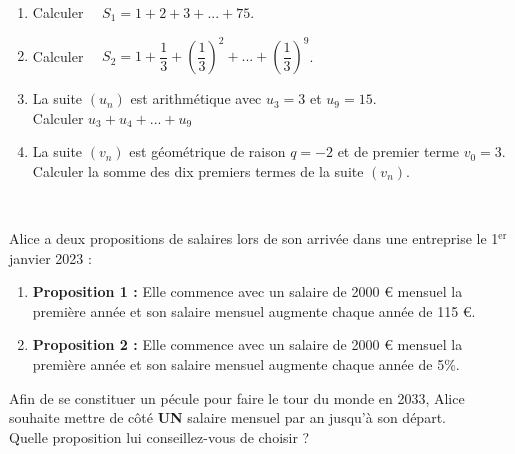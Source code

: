 \documentclass[a4paper,11pt,cours]{nsi} %
\begin{document}
\begin{demonstration}
\end{demonstration}

\begin{exemple}[s]
	\begin{enumerate}
		\item 	Calculer $\quad S_1=1+2+3+...+75$.
		\item 	Calculer $\quad S_2=1+\dfrac{1}{3}+\left(\dfrac{1}{3}\right)^2+...+\left(\dfrac{1}{3}\right)^9$.
		\item 	La suite $(u_n)$ est arithmétique avec $u_3=3$ et $u_9=15$.\\
		Calculer $u_3+u_4+...+u_9$
		\item 	La suite $(v_n)$ est géométrique de raison $q=-2$ et de premier terme $v_0=3$.\\
		Calculer la somme des dix premiers termes de la suite $(v_n)$.
	\end{enumerate}
\end{exemple}
\\


\begin{exercice}[ ]
	Alice a deux propositions de salaires lors de son arrivée dans une entreprise le 1$^{\text{er}}$ janvier 2023 :
	\begin{enumerate}[label=\textbullet]
		\item 	\textbf{Proposition 1 :} Elle commence avec un salaire de 2000 € mensuel la première année et son salaire mensuel augmente chaque année de 115 €.
		\item 	\textbf{Proposition 2 :} Elle commence avec un salaire de 2000 € mensuel la première année et son salaire mensuel augmente chaque année de 5\%.
	\end{enumerate}
	Afin de se constituer un pécule pour faire le tour du monde en 2033, Alice souhaite mettre de côté \textbf{UN} salaire mensuel par an jusqu'à son départ.\\[.5em]
	Quelle proposition lui conseillez-vous de choisir ?
\end{exercice}
\end{document}
